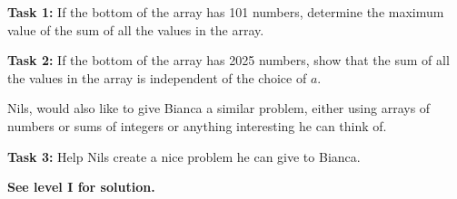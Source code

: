 \documentclass[a4paper,12pt]{article}
\begin{document}
	{\bf Task 1:} If the bottom of the array has 101 numbers, determine the maximum value of the sum of all the values in the array.
	
	{\bf Task 2:} If the bottom of the array has 2025 numbers, show that the sum of all the values in the array is independent of the choice of $a$.
	
	Nils, would also like to give Bianca a similar problem, either using arrays of numbers or sums of integers or anything interesting he can think of.
	
	{\bf Task 3:} Help Nils create a nice problem he can give to Bianca.
	
	\hspace{2cm}
	
	{\bf See level I for solution.}
	
	\endgroup
\end{document}
